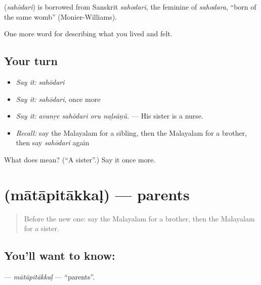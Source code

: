 \begin{cousinweb}
\textbf{} (\emph{sahōdari}) is borrowed from Sanskrit \emph{sahodarī}, the feminine of \emph{sahodara}, \textquotedblleft{}born of the same womb\textquotedblright{} (Monier-Williams).
\end{cousinweb}

\begin{grammarlens}[title={What you've built}]
One more word for describing what you lived and felt.
\end{grammarlens}

\subsection*{Your turn}
\begin{itemize}
\raggedright
  \item \emph{Say it:} \emph{sahōdari}
  \item \emph{Say it:} \emph{sahōdari}, once more
  \item \emph{Say it:} \emph{avanṟe sahōdari oru naḻsāṇŭ.} — His sister is a nurse.
  \item \emph{Recall:} say the Malayalam for a sibling, then the Malayalam for a brother, then say \emph{sahōdari} again
\end{itemize}

\begin{tcolorbox}[breakable,colback=teal!4,colframe=teal!35!black,title={Before you move on}]
What does  mean? (\textquotedblleft{}A sister\textquotedblright{}.) Say it once more.
\end{tcolorbox}
\section[\texorpdfstring{\ml{മാതാപിതാക്കൾ} (mātāpitākkaḷ)}{മാതാപിതാക്കൾ (mātāpitākkaḷ)}]{ (mātāpitākkaḷ) — parents}

\label{lesson:ML-C554-matapitakkal}



\begin{quote}
Before the new one: say the Malayalam for a brother, then the Malayalam for a sister.
\end{quote}

\subsection*{You'll want to know: }
\textbf{} — \emph{mātāpitākkaḷ} — \textquotedblleft{}parents\textquotedblright{}.

